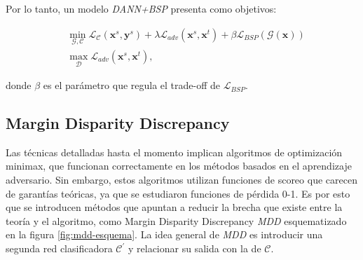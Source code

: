 Por lo tanto, un modelo {\it DANN+BSP} presenta como objetivos:

\begin{align}
   & \min_{\mathcal{G},\mathcal{C}} \mathcal{L}_\mathcal{C}(\mathbf{x}^s, \mathbf{y}^s) + \lambda \mathcal{L}_{adv}(\mathbf{x}^s, \mathbf{x}^t) + \beta \mathcal{L}_{BSP}(\mathcal{G}(\mathbf{x})) \\
   & \max_{\mathcal{D}} \mathcal{L}_{adv}(\mathbf{x}^s, \mathbf{x}^t),
  \label{eq:bsp-dann-obejtivo}
\end{align}

\noindent
donde $\beta$ es el parámetro que regula el trade-off de $\mathcal{L}_{BSP}$.

\subsection{Margin Disparity Discrepancy}

Las técnicas detalladas hasta el momento implican algoritmos de optimización minimax, que funcionan correctamente en
los métodos basados en el aprendizaje adversario. Sin embargo, estos algoritmos utilizan funciones de scoreo que
carecen de garantías teóricas, ya que se estudiaron funciones de pérdida 0-1. Es por esto que se introducen métodos que
apuntan a reducir la brecha que existe entre la teoría y el algoritmo, como Margin Disparity Discrepancy {\it MDD} \parencite{zhang2019bridging} esquematizado en la figura \ref{fig:mdd-esquema}. La idea general de {\it MDD} es introducir
una segunda red clasificadora $\mathcal{C}^{'}$ y relacionar su salida con la de $\mathcal{C}$.

